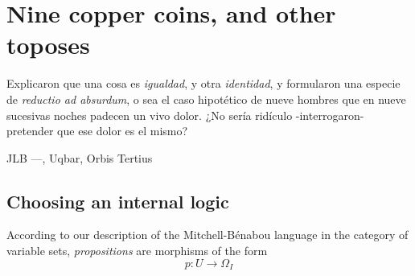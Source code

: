 \section{Nine copper coins, and other toposes}\label{sec_coins}
\epigraph{
  Explicaron que una cosa es \emph{igualdad}, y otra \emph{identidad}, y formularon una especie de \emph{reductio ad absurdum}, o sea el caso hipotético de nueve hombres que en nueve sucesivas noches padecen un vivo dolor. ¿No sería ridículo -interrogaron- pretender que ese dolor es el mismo?
}{JLB ---\tlon, Uqbar, Orbis Tertius}
\subsection{Choosing an internal logic}
According to our description of the Mitchell-Bénabou language in the category of variable sets, \emph{propositions} are morphisms of the form
\[p : U \to \Omega_I\]

